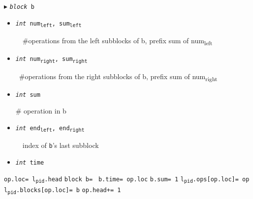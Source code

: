 \documentclass[10pt]{article}
\theoremstyle{definition}
\begin{document}
\begin{algorithm}
\begin{algorithmic}[1]
\begin{multicols}{2}
\Statex $\blacktriangleright$ \texttt{\textsl{block} b}
\begin{itemize}
  \item \texttt{\textsl{int} num\textsubscript{left}, sum\textsubscript{left}}
  
  \textsf{~~\#operations from the left subblocks of b, prefix sum of num\textsubscript{left}}

  \item \texttt{\textsl{int} num\textsubscript{right}, sum\textsubscript{right}}
  
  \textsf{~\#operations from the right subblocks of b, prefix sum of num\textsubscript{right}}
  
  \item \texttt{\textsl{int} sum}
  
  \textsf{\# operation in b}
  
  \item \texttt{\textsl{int} end\textsubscript{left}, end\textsubscript{right}}
  
  \textsf{~~index of \texttt{b}'s last subblock}
  \item \texttt{\textsl{int} time}

\end{itemize}



\Statex

\State \texttt{op.loc= l\textsubscript{pid}.head}
\State \texttt{block b= }
\State \texttt{b.time= op.loc}
\State \texttt{b.sum= 1}
\State \texttt{l\textsubscript{pid}.ops[op.loc]= op}
\State \texttt{l\textsubscript{pid}.blocks[op.loc]= b}
\State \texttt{op.head+= 1}
\State {}
\State \Return {} 


\end{multicols}
\end{algorithmic}
\end{algorithm}
\end{document}
